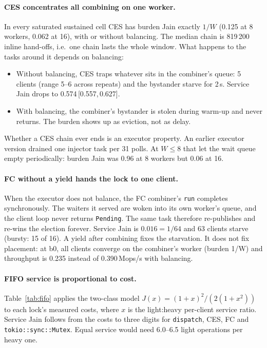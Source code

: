 \documentclass[10pt,twocolumn]{article}
\newcommand{\lk}[1]{\texttt{#1}}
\newcommand{\rng}[2]{{\scriptsize\,[#1,\,#2]}}
\begin{document}
\paragraph{CES concentrates all combining on one worker.}
In every saturated sustained cell CES has burden Jain exactly $1/W$ (0.125 at
8 workers, 0.062 at 16), with or without balancing. The median chain is
819\,200 inline hand-offs, i.e.\ one chain lasts the whole window. What happens
to the tasks around it depends on balancing:
\begin{itemize}
\item Without balancing, CES traps whatever sits in the combiner's queue: 5
  clients (range 5--6 across repeats) and the bystander starve for 2\,s.
  Service Jain drops to 0.574\rng{0.557}{0.627}.
\item With balancing, the combiner's bystander is stolen during warm-up and
  never returns. The burden shows up as eviction, not as delay.
\end{itemize}
Whether a CES chain ever ends is an executor property. An earlier executor
version drained one injector task per 31 polls. At $W\le8$ that let the wait
queue empty periodically: burden Jain was 0.96 at 8 workers but 0.06 at 16.

\paragraph{FC without a yield hands the lock to one client.}
When the executor does not balance, the FC combiner's \lk{run} completes
synchronously. The waiters it served are woken into its own worker's queue, and
the client loop never returns \lk{Pending}. The same task therefore
re-publishes and re-wins the election forever. Service Jain is $0.016=1/64$
and 63 clients starve (bursty: 15 of 16). A yield after combining fixes the
starvation. It does not fix placement: at b0, all clients converge on the
combiner's worker (burden 1/W) and throughput is 0.235 instead of
0.390\,Mops/s with balancing.

\paragraph{FIFO service is proportional to cost.}
Table~\ref{tab:fifo} applies the two-class model
$J(x)=(1+x)^2/(2(1+x^2))$ to each lock's measured costs, where $x$ is the
light:heavy per-client service ratio. Service Jain follows from the costs to
three digits for \lk{dispatch}, CES, FC and \lk{tokio::sync::Mutex}. Equal
service would need 6.0--6.5 light operations per heavy one.
\end{document}
